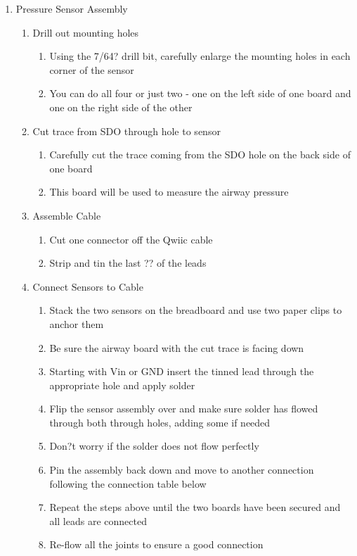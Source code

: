 \documentclass[11pt, letterpaper]{article}
\begin{document}
\begin{enumerate}
\item
Pressure Sensor Assembly
\begin{enumerate}[label=3.\arabic*]
\item
Drill out mounting holes
\begin{enumerate}[label=3.1.\arabic*]
\item
Using the 7/64? drill bit, carefully enlarge the mounting holes in each corner of the sensor
\item
You can do all four or just two - one on the left side of one board and one on the right side of the other
\end{enumerate}
\item
Cut trace from SDO through hole to sensor 
\begin{enumerate}[label=3.2.\arabic*]
\item
Carefully cut the trace coming from the SDO hole on the back side of one board
\item
This board will be used to measure the airway pressure
\end{enumerate}
\item
Assemble Cable
\begin{enumerate}[label=3.3.\arabic*]
\item
Cut one connector off the Qwiic cable
\item
Strip and tin the last ?? of the leads 
\end{enumerate}
\item
Connect Sensors to Cable
\begin{enumerate}[label=3.4.\arabic*]
\item
Stack the two sensors on the breadboard and use two paper clips to anchor them
\item
Be sure the airway board with the cut trace is facing down
\item
Starting with Vin or GND insert the tinned lead through the appropriate hole and apply solder
\item
Flip the sensor assembly over and make sure solder has flowed through both through holes, adding some if needed
\item
Don?t worry if the solder does not flow perfectly
\item
Pin the assembly back down and move to another connection following the connection table below
\item
Repeat the steps above until the two boards have been secured and all leads are connected
\item
Re-flow all the joints to ensure a good connection
\end{enumerate}


\end{enumerate}
\end{enumerate}
\end{document}
